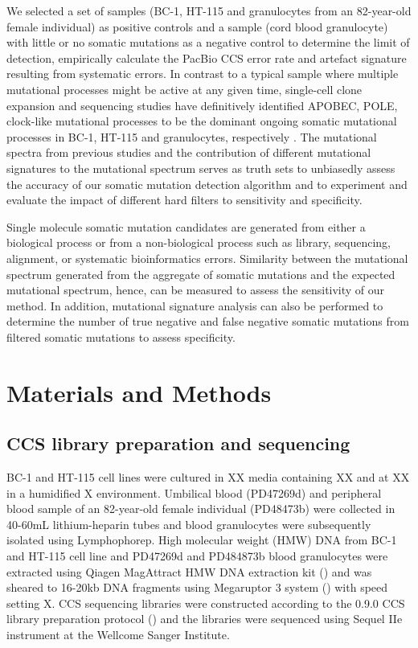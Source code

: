 We selected a set of samples (BC-1, HT-115 and granulocytes from an 82-year-old female individual) as positive controls and a sample (cord blood granulocyte) with little or no somatic mutations as a negative control to determine the limit of detection, empirically calculate the PacBio CCS error rate and artefact signature resulting from systematic errors. In contrast to a typical sample where multiple mutational processes might be active at any given time, single-cell clone expansion and sequencing studies have definitively identified APOBEC, POLE, clock-like mutational processes to be the dominant ongoing somatic mutational processes in BC-1, HT-115 and granulocytes, respectively \cite{Petljak2019-wi, Mitchell2022-ry}. The mutational spectra from previous studies and the contribution of different mutational signatures to the mutational spectrum serves as truth sets to unbiasedly assess the accuracy of our somatic mutation detection algorithm and to experiment and evaluate the impact of different hard filters to sensitivity and specificity.

Single molecule somatic mutation candidates are generated from either a biological process or from a non-biological process such as library, sequencing, alignment, or systematic bioinformatics errors. Similarity between the mutational spectrum generated from the aggregate of somatic mutations and the expected mutational spectrum, hence, can be measured to assess the sensitivity of our method. In addition, mutational signature analysis can also be performed to determine the number of true negative and false negative somatic mutations from filtered somatic mutations to assess specificity. 

\section{Materials and Methods}

\subsection{CCS library preparation and sequencing}
BC-1 and HT-115 cell lines were cultured in XX media containing XX and at XX in a humidified X environment. Umbilical blood (PD47269d) and peripheral blood sample of an 82-year-old female individual (PD48473b) were collected in 40-60mL lithium-heparin tubes and blood granulocytes were subsequently isolated using Lymphophorep. High molecular weight (HMW) DNA from BC-1 and HT-115 cell line and PD47269d and PD484873b blood granulocytes were extracted using Qiagen MagAttract HMW DNA extraction kit () and was sheared to 16-20kb DNA fragments using Megaruptor 3 system () with speed setting X. CCS sequencing libraries were constructed according to the 0.9.0 CCS library preparation protocol () and the libraries were sequenced using Sequel IIe instrument at the Wellcome Sanger Institute. 

